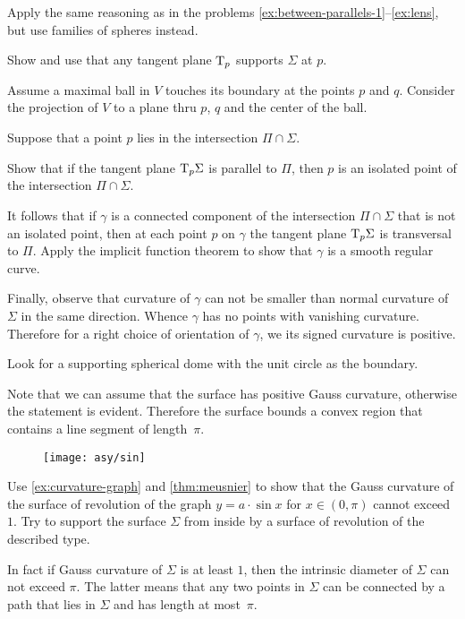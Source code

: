  Apply the same reasoning as in the problems \ref{ex:between-parallels-1}--\ref{ex:lens}, but use families of spheres instead.


 Show and use that any tangent plane $\mathrm{T}_p$ supports $\Sigma$ at $p$.

Assume a maximal ball in $V$ touches its boundary at the points $p$ and $q$.
Consider the projection of $V$ to a plane thru $p$, $q$ and the center of the ball. 

Suppose that a point $p$ lies in the intersection $\Pi\cap\Sigma$.

Show that if the tangent plane $\mathrm{T}_p\Sigma$ is parallel to $\Pi$,
then $p$ is an isolated point of the intersection $\Pi\cap\Sigma$.

It follows that if $\gamma$ is a connected component of the intersection $\Pi\cap\Sigma$ that is not an isolated point,
then at each point $p$ on $\gamma$ the tangent plane $\mathrm{T}_p\Sigma$ is transversal to $\Pi$.
Apply the implicit function theorem to show that $\gamma$ is a smooth regular curve.

Finally, observe that curvature of $\gamma$ can not be smaller than normal curvature of $\Sigma$ in the same direction.
Whence $\gamma$ has no points with vanishing curvature.
Therefore for a right choice of orientation of $\gamma$, we its signed curvature is positive.

Look for a supporting spherical dome with the unit circle as the boundary.

Note that we can assume that the surface has positive Gauss curvature, otherwise the statement is evident.
Therefore the surface bounds a convex region that contains a line segment of length~$\pi$.

\begin{figure}[h!]
\vskip-0mm
\centering
\texttt{[image: asy/sin]}
\vskip-0mm
\end{figure}

Use \ref{ex:curvature-graph} and \ref{thm:meusnier} to show that the Gauss curvature of the surface of revolution of the graph $y=a\cdot \sin x$ for $x\in(0,\pi)$ cannot exceed $1$.
Try to support the surface $\Sigma$ from inside by a surface of revolution of the described type. 

In fact if Gauss curvature of $\Sigma$ is at least $1$,
then
the intrinsic diameter of $\Sigma$ can not exceed $\pi$.
The latter means that any two points in $\Sigma$ can be connected by a path that lies in $\Sigma$ and has length at most~$\pi$.

